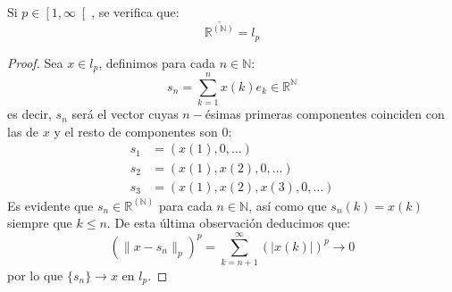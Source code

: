 \begin{prop}
    Si $p\in \left[1,\infty\right[$, se verifica que:
    \begin{equation*}
        \overline{\mathbb{R}^{(\mathbb{N})}} = l_p 
    \end{equation*}
    \begin{proof}
        Sea $x\in l_p$, definimos para cada $n\in \mathbb{N}$:
        \begin{equation*}
            s_n = \sum_{k=1}^{n} x(k)e_k \in \mathbb{R}^\mathbb{N}
        \end{equation*}
        es decir, $s_n$ será el vector cuyas $n-$ésimas primeras componentes coinciden con las de $x$ y el resto de componentes son $0$:
        \begin{align*}
            s_1 &= (x(1), 0, \ldots) \\
            s_2 &= (x(1), x(2), 0,\ldots) \\
            s_3 &= (x(1), x(2), x(3), 0,\ldots) 
        \end{align*}
        Es evidente que $s_n\in \mathbb{R}^{(\mathbb{N})}$ para cada $n\in \mathbb{N}$, así como que $s_n(k) = x(k)$ siempre que $k\leq n$. De esta última observación deducimos que:
        \begin{equation*}
            {(\|x-s_n\|_p)}^{p} = \sum_{k=n+1}^{\infty} {(|x(k)|)}^{p} \to 0
        \end{equation*}
        por lo que $\{s_n\}\to x$ en $l_p$.
    \end{proof}
\end{prop}

